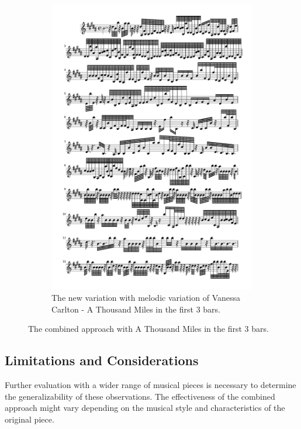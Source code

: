\documentclass[11pt]{article}
\theoremstyle{definition}
\begin{document}
\begin{figure}
\begin{subfigure}{\textwidth}
\includegraphics[trim=1cm 23.75cm 1cm 0.5cm, clip, scale=0.8]{New_ATM.pdf}
\caption{The new variation with melodic variation of Vanessa Carlton - A Thousand Miles in the first 3 bars.} 
\label{fig:NATM}
\end{subfigure}
\caption{The combined approach with A Thousand Miles in the first 3 bars.} 
\label{fig: exam2}
\end{figure}

\subsection{Limitations and Considerations}

Further evaluation with a wider range of musical pieces is necessary to determine the generalizability of these observations. The effectiveness of the combined approach might vary depending on the musical style and characteristics of the original piece.
\end{document}
